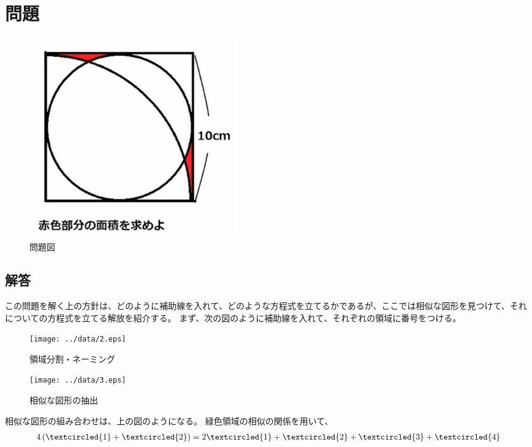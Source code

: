 \section{問題}
\begin{figure}[htbp]
\begin{center}
\includegraphics[width=9cm]{../data/1.eps}
\end{center}
\caption{問題図}
\end{figure}

\subsection{解答}
この問題を解く上の方針は、どのように補助線を入れて、どのような方程式を立てるかであるが、ここでは相似な図形を見つけて、それについての方程式を立てる解放を紹介する。
まず、次の図のように補助線を入れて、それぞれの領域に番号をつける。

\newpage
\begin{figure}[htbp]
\begin{center}
\texttt{[image: ../data/2.eps]}
\end{center}
\caption{領域分割・ネーミング}
\end{figure}


\begin{figure}[]
\begin{center}
\texttt{[image: ../data/3.eps]}
\end{center}
\caption{相似な図形の抽出}
\end{figure}

\newpage
相似な図形の組み合わせは、上の図のようになる。
緑色領域の相似の関係を用いて、
\begin{eqnarray}
4 \left( \textcircled{1} + \textcircled{2} \right) = 2 \textcircled{1} + \textcircled{2} + \textcircled{3} + \textcircled{4}
\end{eqnarray}

